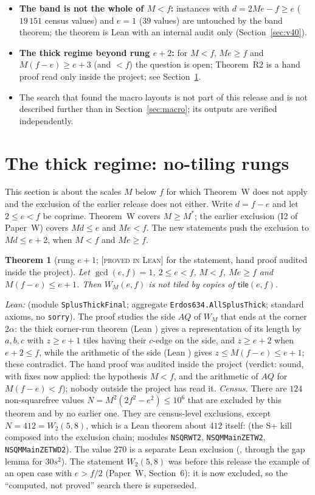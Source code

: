 \documentclass[11pt,reqno]{amsart}
\theoremstyle{plain}
\newtheorem{theorem}{Theorem}[section]
\theoremstyle{definition}
\newcommand{\lab}[1]{\textup{[\textsc{#1}]}}
\newcommand{\PL}{\lab{proved in Lean}}
\newcommand{\tile}{\mathsf{tile}}
\begin{document}
\begin{itemize}
\item \textbf{The band is not the whole of $M<f$:} instances with $d=2Me-f\ge e$ ($19\,151$ census values) and $e=1$ ($39$ values) are untouched by the band theorem; the theorem is Lean with an internal audit only (Section~\ref{sec:v40}).
\item \textbf{The thick regime beyond rung $e+2$:} for $M<f$, $Me\ge f$ and $M(f-e)\ge e+3$ (and $<f$) the question is open; Theorem~R2 is a hand proof read only inside the project; see Section~\ref{sec:thick}.
\item The search that found the macro layouts is not part of this release and is not described further than in Section~\ref{sec:macro}; its outputs are verified independently.
\end{itemize}


\section{The thick regime: no-tiling rungs}\label{sec:thick}
This section is about the scales $M$ below $f$ for which Theorem~W does not apply and the exclusion of the earlier release does not either. Write $d=f-e$ and let $2\le e<f$ be coprime. Theorem~W covers $M\ge M^*$; the earlier exclusion (I2 of Paper~W) covers $Md\le e$ and $Me<f$. The new statements push the exclusion to $Md\le e+2$, when $M<f$ and $Me\ge f$.
\begin{theorem}[rung $e+1$; \PL{} for the statement, hand proof audited inside the project]\label{thm:thick1}
Let $\gcd(e,f)=1$, $2\le e<f$, $M<f$, $Me\ge f$ and $M(f-e)\le e+1$. Then $W_M(e,f)$ is not tiled by copies of $\tile(e,f)$.
\end{theorem}
\emph{Lean:}  (module \texttt{SplusThickFinal}; aggregate \texttt{Erdos634.AllSplusThick}; standard axioms, no \texttt{sorry}). The proof studies the side $AQ$ of $W_M$ that ends at the corner $2\alpha$: the thick corner-run theorem (Lean ) gives a representation of its length by $a,b,c$ with $z\ge e+1$ tiles having their $c$-edge on the side, and $z\ge e+2$ when $e+2\le f$, while the arithmetic of the side (Lean ) gives $z\le M(f-e)\le e+1$; these contradict. The hand proof was audited inside the project (verdict: sound, with fixes now applied: the hypothesis $M<f$, and the arithmetic of $AQ$ for $M(f-e)<f$); nobody outside the project has read it.
\emph{Census.} There are $124$ non-squarefree values $N=M^2(2f^2-e^2)\le10^6$ that are excluded by this theorem and by no earlier one. They are census-level exclusions, except $N=412=W_2(5,8)$, which is a Lean theorem about $412$ itself:  (the S+ kill composed into the exclusion chain; modules \texttt{NSQRWT2}, \texttt{NSQMMainZETW2}, \texttt{NSQMMainZETWD2}). The value $270$ is a separate Lean exclusion (, through the gap lemma for $30s^2$). The statement $W_2(5,8)$ was before this release the example of an open case with $e>f/2$ (Paper~W, Section~6): it is now excluded, so the ``computed, not proved'' search there is superseded.
\end{document}
